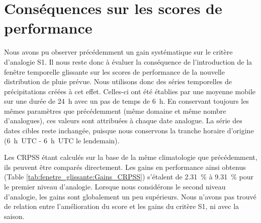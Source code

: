\documentclass[hess]{copernicus}
\begin{document}
\section{Conséquences sur les scores de performance}

Nous avons pu observer précédemment un gain systématique sur le critère d'analogie S1. Il nous reste donc à évaluer la conséquence de l'introduction de la fenêtre temporelle glissante sur les scores de performance de la nouvelle distribution de pluie prévue. Nous utilisons donc des séries temporelles de précipitations créées à cet effet. Celles-ci ont été établies par une moyenne mobile sur une durée de 24~h avec un pas de temps de 6~h. En conservant toujours les mêmes paramètres que précédemment (même domaine et même nombre d'analogues), ces valeurs sont attribuées à chaque date analogue. La série des dates cibles reste inchangée, puisque nous conservons la tranche horaire d'origine (6~h~UTC - 6~h~UTC le lendemain). 

Les CRPSS étant calculés sur la base de la même climatologie que précédemment, ils peuvent être comparés directement. Les gains en performance ainsi obtenus (Table \ref{tab:fenetre_glissante:Gains_CRPSS}) s'étalent de 2.31~\% à 9.31~\% pour le premier niveau d'analogie. Lorsque nous considérons le second niveau d'analogie, les gains sont globalement un peu supérieurs. Nous n'avons pas trouvé de relation entre l'amélioration du score et les gains du critère S1, ni avec la saison.
\end{document}
